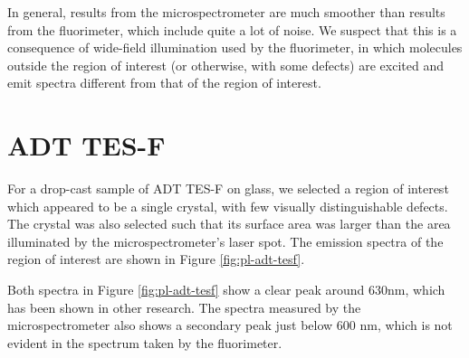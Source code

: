 In general, results from the microspectrometer are much smoother than results from the fluorimeter, which include quite a lot of noise.  We suspect that this is a consequence of wide-field illumination used by the fluorimeter, in which molecules outside the region of interest (or otherwise, with some defects) are excited and emit spectra different from that of the region of interest. 

\section{ADT TES-F}

For a drop-cast sample of ADT TES-F on glass, we selected a region of interest which appeared to be a single crystal, with few visually distinguishable defects. The crystal was also selected such that its surface area was larger than the area illuminated by the microspectrometer's laser spot. The emission spectra of the region of interest are shown in Figure \ref{fig:pl-adt-tesf}.


Both spectra in Figure \ref{fig:pl-adt-tesf} show a clear peak around 630nm, which has been shown in other research.\cite{lam_polarization_2018}\cite{ostroverkhova_organic_2016} The spectra measured by the microspectrometer also shows a secondary peak just below 600 nm, which is not evident in the spectrum taken by the fluorimeter. 

